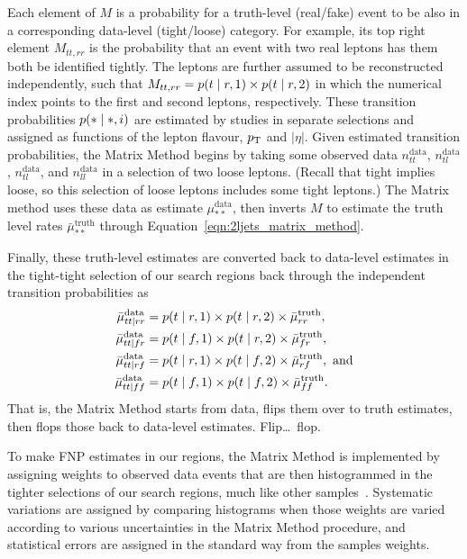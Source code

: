 Each element of $M$ is a probability for a truth-level (real/fake) event to be
also in a corresponding data-level (tight/loose) category.
For example, its top right element $M_{{tt}, {rr}}$ is the
probability that an event with two real leptons has them both be identified
tightly.
The leptons are further assumed to be reconstructed independently, such that
$M_{{tt}, {rr}} =
p(t \mid r,1)
\times p(t \mid r,2)$
in which the numerical index points to the first and second leptons,
respectively.
These transition probabilities $p(* \mid *,i)$ are estimated by studies in
separate selections and assigned as functions of the lepton
flavour, $p_\mathrm{T}$ and $|\eta|$.
Given estimated transition probabilities, the Matrix Method begins by
taking some observed data
$n^\textrm{data}_{tt}$,
$n^\textrm{data}_{tl}$,
$n^\textrm{data}_{tl}$,
and $n^\textrm{data}_{ll}$
in a selection of two loose leptons.
(Recall that tight implies loose, so this selection of loose leptons includes
some tight leptons.)
The Matrix method uses these data as estimate $\mu^\textrm{data}_{**}$,
then inverts $M$ to estimate the truth level rates
$\bar \mu^\textrm{truth}_{**}$ through Equation~\ref{eqn:2ljets_matrix_method}.

Finally, these truth-level estimates are converted back to data-level
estimates in the tight-tight selection of our search regions back through the
independent transition probabilities as
\begin{align}
\bar \mu^\textrm{data}_{tt\mid rr} &=
p(t \mid r,1)
\times p(t \mid r,2)
\times \bar \mu^\textrm{truth}_{rr}, \\
\bar \mu^\textrm{data}_{tt\mid fr} &=
p(t \mid f,1)
\times p(t \mid r,2)
\times \bar \mu^\textrm{truth}_{fr}, \\
\bar \mu^\textrm{data}_{tt\mid rf} &=
p(t \mid r,1)
\times p(t \mid f,2)
\times \bar \mu^\textrm{truth}_{rf},~\textrm{and} \\
\bar \mu^\textrm{data}_{tt\mid ff} &=
p(t \mid f,1)
\times p(t \mid f,2)
\times \bar \mu^\textrm{truth}_{ff}.
\end{align}
That is, the Matrix Method starts from data, flips them over to truth
estimates, then flops those back to data-level estimates.
Flip\ldots\ flop.

To make FNP estimates in our regions, the Matrix Method is
implemented by assigning weights to observed data events that are then
histogrammed in the tighter selections of our search regions,
much like other samples~\cite{twoljets2018int}.
Systematic variations are assigned by comparing histograms when those weights
are varied according to various uncertainties in the Matrix Method procedure,
and statistical errors are assigned in the standard way from the samples
weights.

